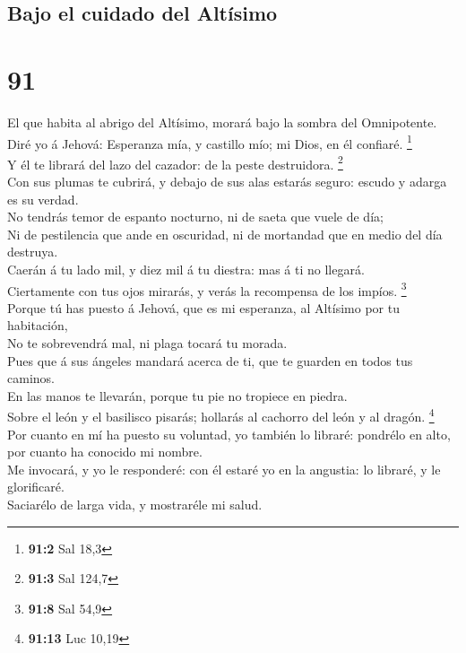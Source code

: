 \hypertarget{bajo-el-cuidado-del-altuxedsimo}{%
\subsection{Bajo el cuidado del
Altísimo}\label{bajo-el-cuidado-del-altuxedsimo}}

\hypertarget{section-90}{%
\section{91}\label{section-90}}

 El que habita al abrigo del Altísimo, morará bajo la sombra
del Omnipotente.\\
 Diré yo á Jehová: Esperanza mía, y castillo mío; mi Dios,
en él confiaré. \footnote{\textbf{91:2} Sal 18,3}\\
 Y él te librará del lazo del cazador: de la peste
destruidora. \footnote{\textbf{91:3} Sal 124,7}\\
 Con sus plumas te cubrirá, y debajo de sus alas estarás
seguro: escudo y adarga es su verdad.\\
 No tendrás temor de espanto nocturno, ni de saeta que vuele
de día;\\
 Ni de pestilencia que ande en oscuridad, ni de mortandad
que en medio del día destruya.\\
 Caerán á tu lado mil, y diez mil á tu diestra: mas á ti no
llegará.\\
 Ciertamente con tus ojos mirarás, y verás la recompensa de
los impíos. \footnote{\textbf{91:8} Sal 54,9}\\
 Porque tú has puesto á Jehová, que es mi esperanza, al
Altísimo por tu habitación,\\
 No te sobrevendrá mal, ni plaga tocará tu morada.\\
 Pues que á sus ángeles mandará acerca de ti, que te
guarden en todos tus caminos.\\
 En las manos te llevarán, porque tu pie no tropiece en
piedra.\\
 Sobre el león y el basilisco pisarás; hollarás al cachorro
del león y al dragón. \footnote{\textbf{91:13} Luc 10,19}\\
 Por cuanto en mí ha puesto su voluntad, yo también lo
libraré: pondrélo en alto, por cuanto ha conocido mi nombre.\\
 Me invocará, y yo le responderé: con él estaré yo en la
angustia: lo libraré, y le glorificaré.\\
 Saciarélo de larga vida, y mostraréle mi salud.

